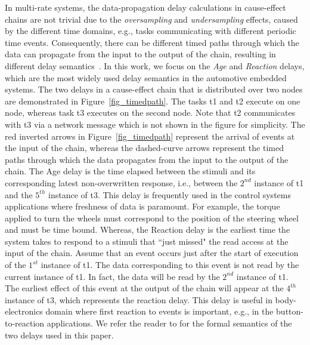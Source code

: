 In multi-rate systems, the data-propagation delay calculations in cause-effect chains are not trivial due to the \textit{oversampling} and \textit{undersampling} effects, caused by the different time domains, e.g., tasks communicating with different periodic time events. Consequently, there can be different timed paths through which the data can propagate from the input to the output of the chain, resulting in different delay semantics~\cite{mubeen2013support}. In this work, we focus on the \textit{Age} and \textit{Reaction} delays, which are the most widely used delay semantics in the automotive embedded systems. The two delays in a cause-effect chain that is distributed over two nodes  are demonstrated in Figure~\ref{fig_timedpath}. The tasks t1 and t2 execute on one node, whereas task t3 executes on the second node. Note that t2 communicates with t3 via a network message which is not shown in the figure for simplicity. The red inverted arrows in Figure~\ref{fig_timedpath} represent the arrival of events at the input of the chain, whereas the dashed-curve arrows represent the timed paths through which the data propagates from the input to the output of the chain. The Age delay is the time elapsed between the stimuli and its corresponding latest non-overwritten response, i.e., between the $2^{nd}$ instance of t1 and the $5^{th}$ instance of t3. This delay is frequently used in the control systems applications where freshness of data is paramount. For example, the torque applied to turn the wheels must correspond to the position of the steering wheel and must be time bound. Whereas, the Reaction delay is the earliest time the system takes to respond to a stimuli that ``just missed" the read access at the input of the chain. Assume that an event occurs just after the start of execution of the $1^{st}$ instance of t1. The data corresponding to this event is not read by the current instance of t1. In fact, the data will be read by the $2^{nd}$ instance of t1. The earliest effect of this event at the output of the chain will appear at the $4^{th}$ instance of t3, which represents the reaction delay. This delay is useful in body-electronics domain where first reaction to events is important, e.g., in the button-to-reaction applications. We refer the reader to \cite{mubeen2013support} for the formal semantics of the two delays used in this paper.
